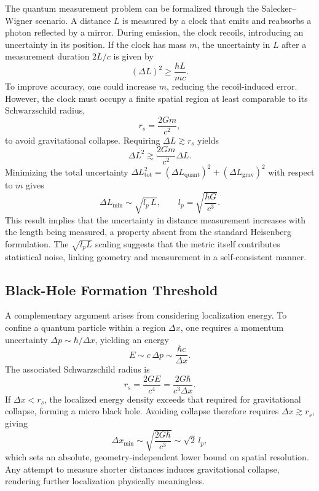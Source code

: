 \documentclass[11pt,oneside]{book}
\numberwithin{equation}{chapter}
\begin{document}
The quantum measurement problem can be formalized through the Salecker--Wigner scenario.  
A distance $L$ is measured by a clock that emits and reabsorbs a photon reflected by a mirror.  
During emission, the clock recoils, introducing an uncertainty in its position.  
If the clock has mass $m$, the uncertainty in $L$ after a measurement duration $2L/c$ is given by
\begin{equation}
(\Delta L)^2 \ge \frac{\hbar L}{m c}.
\label{eq:SW1}
\end{equation}
To improve accuracy, one could increase $m$, reducing the recoil-induced error.  
However, the clock must occupy a finite spatial region at least comparable to its Schwarzschild radius,
\begin{equation}
r_s = \frac{2Gm}{c^2},
\label{eq:rs}
\end{equation}
to avoid gravitational collapse.  
Requiring $\Delta L \gtrsim r_s$ yields
\begin{equation}
\Delta L^2 \gtrsim \frac{2Gm}{c^2}\Delta L.
\end{equation}
Minimizing the total uncertainty $\Delta L_{\text{tot}}^2=(\Delta L_{\text{quant}})^2+(\Delta L_{\text{grav}})^2$ with respect to $m$ gives
\begin{equation}
\Delta L_{\min} \sim \sqrt{l_p\,L},
\qquad l_p=\sqrt{\frac{\hbar G}{c^3}}.
\label{eq:SW2}
\end{equation}
This result implies that the uncertainty in distance measurement increases with the length being measured, a property absent from the standard Heisenberg formulation.  
The $\sqrt{l_pL}$ scaling suggests that the metric itself contributes statistical noise, linking geometry and measurement in a self-consistent manner.

\subsection*{Black-Hole Formation Threshold}

A complementary argument arises from considering localization energy.  
To confine a quantum particle within a region $\Delta x$, one requires a momentum uncertainty $\Delta p\sim\hbar/\Delta x$, yielding an energy
\begin{equation}
E\sim c\,\Delta p\sim \frac{\hbar c}{\Delta x}.
\end{equation}
The associated Schwarzschild radius is
\begin{equation}
r_s=\frac{2GE}{c^4}=\frac{2G\hbar}{c^3\Delta x}.
\label{eq:rS}
\end{equation}
If $\Delta x<r_s$, the localized energy density exceeds that required for gravitational collapse, forming a micro black hole.  
Avoiding collapse therefore requires $\Delta x\gtrsim r_s$, giving
\begin{equation}
\Delta x_{\min}\sim \sqrt{\frac{2G\hbar}{c^3}}\sim \sqrt{2}\,l_p,
\label{eq:BHlimit}
\end{equation}
which sets an absolute, geometry-independent lower bound on spatial resolution.  
Any attempt to measure shorter distances induces gravitational collapse, rendering further localization physically meaningless.
\end{document}
